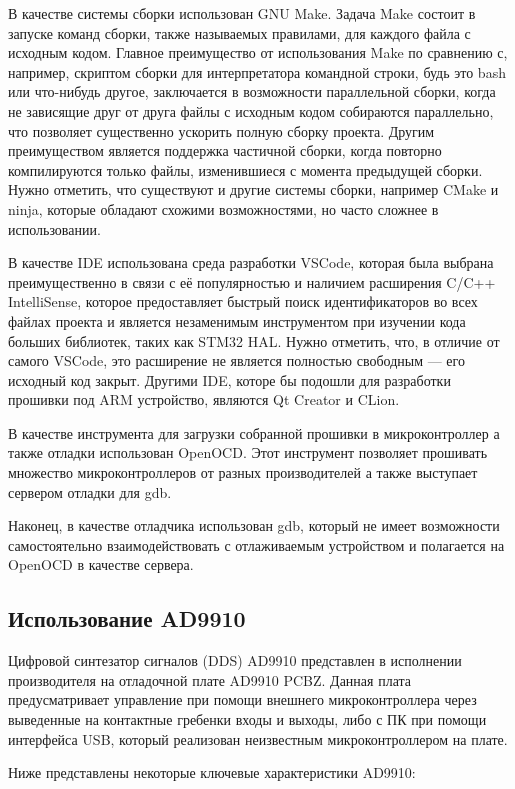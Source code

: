 \documentclass[rusmathsym, eqnumwithinsec, amspack, hyperref]{bomgost}
\begin{document}
В качестве системы сборки использован GNU Make. Задача Make состоит в запуске команд сборки, также называемых правилами, для каждого файла с исходным кодом. Главное преимущество от использования Make по сравнению с, например, скриптом сборки для интерпретатора командной строки, будь это bash или что-нибудь другое, заключается в возможности параллельной сборки, когда не зависящие друг от друга файлы с исходным кодом собираются параллельно, что позволяет существенно ускорить полную сборку проекта. Другим преимуществом является поддержка частичной сборки, когда повторно компилируются только файлы, изменившиеся с момента предыдущей сборки. Нужно отметить, что существуют и другие системы сборки, например CMake и ninja, которые обладают схожими возможностями, но часто сложнее в использовании.

В качестве IDE использована среда разработки VSCode, которая была выбрана преимущественно в связи с её популярностью и наличием расширения C/C++ IntelliSense, которое предоставляет быстрый поиск идентификаторов во всех файлах проекта и является незаменимым инструментом при изучении кода больших библиотек, таких как STM32 HAL. Нужно отметить, что, в отличие от самого VSCode, это расширение не является полностью свободным — его исходный код закрыт. Другими IDE, которе бы подошли для разработки прошивки под ARM устройство, являются Qt Creator и CLion.

В качестве инструмента для загрузки собранной прошивки в микроконтроллер а также отладки использован OpenOCD. Этот инструмент позволяет прошивать множество микроконтроллеров от разных производителей а также выступает сервером отладки для gdb.

Наконец, в качестве отладчика использован gdb, который не имеет возможности самостоятельно взаимодействовать с отлаживаемым устройством и полагается на OpenOCD в качестве сервера.

\subsection{Использование AD9910}

Цифровой синтезатор сигналов (DDS) AD9910 представлен в исполнении производителя на отладочной плате AD9910 PCBZ. Данная плата предусматривает управление при помощи внешнего микроконтроллера через выведенные на контактные гребенки входы и выходы, либо с ПК при помощи интерфейса USB, который реализован неизвестным микроконтроллером на плате.

Ниже представлены некоторые ключевые характеристики AD9910:
\end{document}
